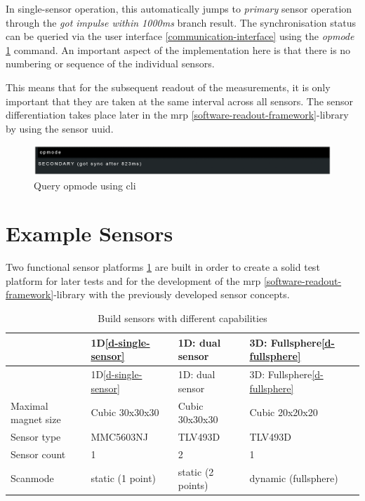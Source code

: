 In single-sensor operation, this automatically jumps to \emph{primary}
sensor operation through the \emph{got impulse within 1000ms} branch
result. The synchronisation status can be queried via the user interface
\ref{communication-interface} using the \emph{opmode}
\ref{Query_opmode_using_(+cli).png} command. An important aspect of the
implementation here is that there is no numbering or sequence of the
individual sensors.

This means that for the subsequent readout of the measurements, it is
only important that they are taken at the same interval across all
sensors. The sensor differentiation takes place later in the \gls{mrp}
\ref{software-readout-framework}-library by using the sensor \gls{uuid}.

\begin{figure}
\centering
\includegraphics{./generated_images/border_Query_opmode_using_(+cli).png}
\caption{Query opmode using \gls{cli}
\label{Query_opmode_using_(+cli).png}}
\end{figure}

\hypertarget{example-sensors}{%
\section{Example Sensors}\label{example-sensors}}

Two functional sensor platforms
\ref{Build_sensors_with_different_capabilities.csv} are built in order
to create a solid test platform for later tests and for the development
of the \gls{mrp} \ref{software-readout-framework}-library with the
previously developed sensor concepts.

\begin{longtable}[]{@{}llll@{}}
\caption{Build sensors with different capabilities
\label{Build_sensors_with_different_capabilities.csv}}\tabularnewline
\toprule
& 1D\ref{d-single-sensor} & 1D: dual sensor & 3D:
Fullsphere\ref{d-fullsphere}\tabularnewline
\midrule
\endfirsthead
\toprule
& 1D\ref{d-single-sensor} & 1D: dual sensor & 3D:
Fullsphere\ref{d-fullsphere}\tabularnewline
\midrule
\endhead
Maximal magnet size & Cubic 30x30x30 & Cubic 30x30x30 & Cubic
20x20x20\tabularnewline
Sensor type & MMC5603NJ & TLV493D & TLV493D\tabularnewline
Sensor count & 1 & 2 & 1\tabularnewline
Scanmode & static (1 point) & static (2 points) & dynamic
(fullsphere)\tabularnewline
\bottomrule
\end{longtable}

